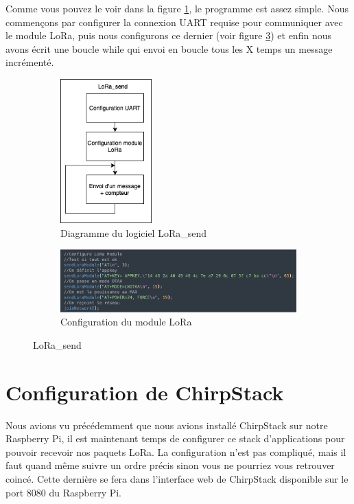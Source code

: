 \documentclass{article}
\begin{document}
		Comme vous pouvez le voir dans la figure \ref{fig:lorasend}, le programme est assez simple. Nous commençons par configurer la connexion UART requise pour communiquer avec le module LoRa, puis nous configurons ce dernier (voir figure \ref{fig:atlorasend}) et enfin nous avons écrit une boucle while qui envoi en boucle tous les X temps un message incrémenté.
		\begin{figure}[H]
			\centering
			\begin{subfigure}{0.20\textwidth}
				\centering
				\includegraphics[height=15em]{LoRa_send.drawio}
				\caption{Diagramme du logiciel LoRa\_send}
				\label{fig:lorasend}
			\end{subfigure}
			\begin{subfigure}{0.70\textwidth}
				\centering
				\includegraphics[width=1\linewidth]{atLorasend}
				\caption{Configuration du module LoRa}
				\label{fig:atlorasend}
			\end{subfigure}
			\caption{LoRa\_send}
		\end{figure}
	
	\section{Configuration de ChirpStack}
		Nous avions vu précédemment que nous avions installé ChirpStack sur notre Raspberry Pi, il est maintenant temps de configurer ce stack d'applications pour pouvoir recevoir nos paquets LoRa.
		La configuration n'est pas compliqué, mais il faut quand même suivre un ordre précis sinon vous ne pourriez vous retrouver coincé. Cette dernière se fera dans l'interface web de ChirpStack disponible sur le port 8080 du Raspberry Pi.
		
\end{document}

